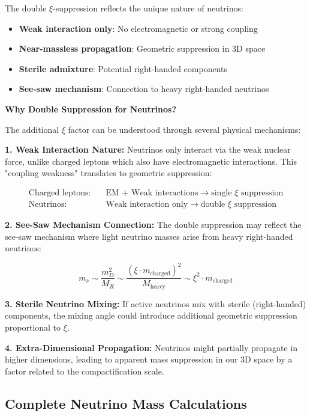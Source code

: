 \documentclass[12pt,a4paper]{article}
\begin{document}
	The double $\xi$-suppression reflects the unique nature of neutrinos:
	\begin{itemize}
		\item \textbf{Weak interaction only}: No electromagnetic or strong coupling
		\item \textbf{Near-massless propagation}: Geometric suppression in 3D space
		\item \textbf{Sterile admixture}: Potential right-handed components
		\item \textbf{See-saw mechanism}: Connection to heavy right-handed neutrinos
	\end{itemize}
	
	\textbf{Why Double Suppression for Neutrinos?}
	
	The additional $\xi$ factor can be understood through several physical mechanisms:
	
	\textbf{1. Weak Interaction Nature:}
	Neutrinos only interact via the weak nuclear force, unlike charged leptons which also have electromagnetic interactions. This "coupling weakness" translates to geometric suppression:
	
	\begin{align}
		\text{Charged leptons:} \quad &\text{EM + Weak interactions} \rightarrow \text{single } \xi \text{ suppression} \\
		\text{Neutrinos:} \quad &\text{Weak interaction only} \rightarrow \text{double } \xi \text{ suppression}
	\end{align}
	
	\textbf{2. See-Saw Mechanism Connection:}
	The double suppression may reflect the see-saw mechanism where light neutrino masses arise from heavy right-handed neutrinos:
	
	\begin{equation}
		m_{\nu} \sim \frac{m_D^2}{M_R} \sim \frac{(\xi \cdot m_\text{charged})^2}{M_\text{heavy}} \sim \xi^2 \cdot m_\text{charged}
	\end{equation}
	
	\textbf{3. Sterile Neutrino Mixing:}
	If active neutrinos mix with sterile (right-handed) components, the mixing angle could introduce additional geometric suppression proportional to $\xi$.
	
	\textbf{4. Extra-Dimensional Propagation:}
	Neutrinos might partially propagate in higher dimensions, leading to apparent mass suppression in our 3D space by a factor related to the compactification scale.
	
	\subsection{Complete Neutrino Mass Calculations}
	\label{subsec:neutrino_calculations}
	
\end{document}

